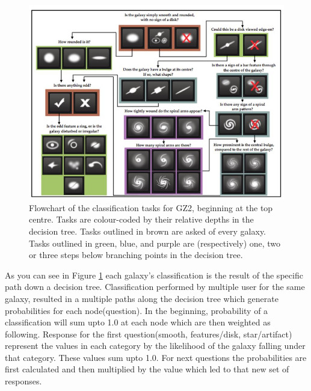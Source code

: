 \begin{figure}[h]
\centering
\includegraphics[scale=0.9]{figures/decision_tree.jpg}
\caption{Flowchart of the classification tasks for GZ2, beginning at the top centre. Tasks are colour-coded by their relative depths in the decision tree. Tasks outlined in brown are asked of every galaxy. Tasks outlined in green, blue, and purple are (respectively) one, two or three steps below branching points in the decision tree\cite{galaxyzoo2}.}
\label{decision_tree}
\end{figure}


As you can see in Figure \ref{decision_tree} each galaxy's classification is the result of the specific path down a decision tree. Classification performed by multiple user for the same galaxy, resulted in a multiple paths along the decision tree which generate probabilities for each node(question). In the beginning, probability of a classification will sum upto 1.0 at each node which are then weighted as following. Response for the first question(smooth, features/disk, star/artifact) represent the values in each category by the likelihood of the galaxy falling under that category. These values sum upto 1.0. For next questions the probabilities are first calculated and then multiplied by the value which led to that new set of responses\cite{kaggledata}.   
